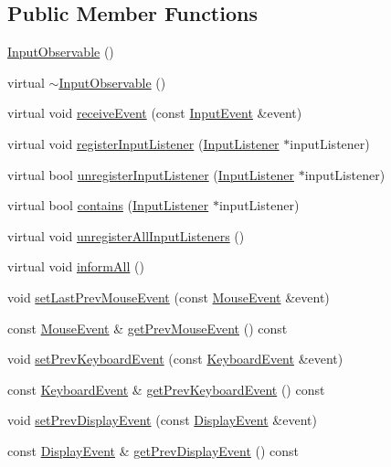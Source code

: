 \subsection*{Public Member Functions}
\begin{DoxyCompactItemize}
\item 
\mbox{\hyperlink{classec_1_1_input_observable_a92422814189d1210f631f4d1378877f3}{Input\+Observable}} ()
\item 
virtual \mbox{\hyperlink{classec_1_1_input_observable_ac261f6a73cfdcd37c276e732cc25f869}{$\sim$\+Input\+Observable}} ()
\item 
virtual void \mbox{\hyperlink{classec_1_1_input_observable_ac35d29f643a2735e4cb38cb6ee1354aa}{receive\+Event}} (const \mbox{\hyperlink{structec_1_1_input_event}{Input\+Event}} \&event)
\item 
virtual void \mbox{\hyperlink{classec_1_1_input_observable_a542bd14ecfbeceed917ea0df5c7f3755}{register\+Input\+Listener}} (\mbox{\hyperlink{classec_1_1_input_listener}{Input\+Listener}} $\ast$input\+Listener)
\item 
virtual bool \mbox{\hyperlink{classec_1_1_input_observable_aab1af4952f6127781eade6dccf33aafb}{unregister\+Input\+Listener}} (\mbox{\hyperlink{classec_1_1_input_listener}{Input\+Listener}} $\ast$input\+Listener)
\item 
virtual bool \mbox{\hyperlink{classec_1_1_input_observable_a6e14f68359b8d7e1be60e8503a07ea87}{contains}} (\mbox{\hyperlink{classec_1_1_input_listener}{Input\+Listener}} $\ast$input\+Listener)
\item 
virtual void \mbox{\hyperlink{classec_1_1_input_observable_ac8d3ed43a3b26601e2710e3758248620}{unregister\+All\+Input\+Listeners}} ()
\item 
virtual void \mbox{\hyperlink{classec_1_1_input_observable_ac8ac61eaebb95010e8a12bb1e6348391}{inform\+All}} ()
\item 
void \mbox{\hyperlink{classec_1_1_input_observable_abcd9d6067210ea7751824b619147a65c}{set\+Last\+Prev\+Mouse\+Event}} (const \mbox{\hyperlink{structec_1_1_mouse_event}{Mouse\+Event}} \&event)
\item 
const \mbox{\hyperlink{structec_1_1_mouse_event}{Mouse\+Event}} \& \mbox{\hyperlink{classec_1_1_input_observable_abf9f1388171a99581a0a4100bbf2d11b}{get\+Prev\+Mouse\+Event}} () const
\item 
void \mbox{\hyperlink{classec_1_1_input_observable_afcc8abf8d747417f50465189e632d0dd}{set\+Prev\+Keyboard\+Event}} (const \mbox{\hyperlink{structec_1_1_keyboard_event}{Keyboard\+Event}} \&event)
\item 
const \mbox{\hyperlink{structec_1_1_keyboard_event}{Keyboard\+Event}} \& \mbox{\hyperlink{classec_1_1_input_observable_ab1ba2fa8deaf1d69a4809e4d8dc61452}{get\+Prev\+Keyboard\+Event}} () const
\item 
void \mbox{\hyperlink{classec_1_1_input_observable_a55c7310a50dc873f69c2246bbeeed3e6}{set\+Prev\+Display\+Event}} (const \mbox{\hyperlink{structec_1_1_display_event}{Display\+Event}} \&event)
\item 
const \mbox{\hyperlink{structec_1_1_display_event}{Display\+Event}} \& \mbox{\hyperlink{classec_1_1_input_observable_ac12e711d3a7dcaf65d2028d2283c1243}{get\+Prev\+Display\+Event}} () const
\end{DoxyCompactItemize}
